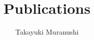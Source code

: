 \documentclass{article}
\title{Publications}
\author{Takayuki Muranushi}
\begin{document}
\maketitle

\nocite{*}



\end{document}
